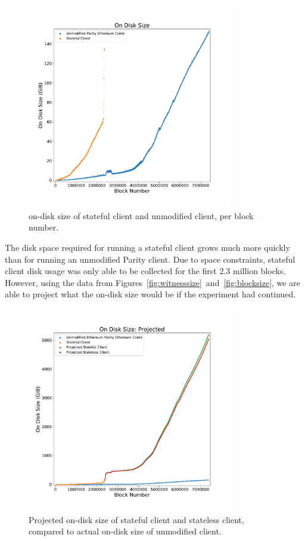 \documentclass[12pt]{article}
\begin{document}
\begin{figure}[H]
  \centering
  \includegraphics[width=0.8\textwidth]{../figures/results/graphs/background/on-disk-size.pdf}
  \caption{on-disk size of stateful client and unmodified client, per block number.}
  \label{fig:ondisksize}
\end{figure}

The disk space required for running a stateful client grows much more quickly than for running an unmodified Parity client. Due to space constraints, stateful client disk usage was only able to be collected for the first 2.3 million blocks. However, using the data from Figures~\ref{fig:witnesssize}~and~\ref{fig:blocksize}, we are able to project what the on-disk size would be if the experiment had continued.

\begin{figure}[H]
  \centering
  \includegraphics[width=0.8\textwidth]{../figures/results/graphs/background/projected-on-disk-size.pdf}
  \caption{Projected on-disk size of stateful client and stateless client, compared to actual on-disk size of unmodified client.}
  \label{fig:projectedondisksize}
\end{figure}
\end{document}
